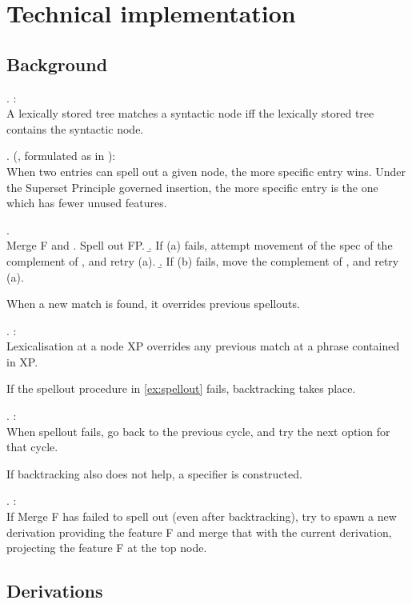 
\chapter{Technical implementation}


\section{Background}

\ex.  \citet{starke2009}:\\
A lexically stored tree matches a syntactic node iff the lexically stored tree contains the syntactic node.

\ex.  (\citealt{kiparsky1973}, formulated as in \citealt{caha2019}):\\
When two entries can spell out a given node, the more specific entry wins. Under the Superset Principle governed insertion, the more specific entry is the one which has fewer unused features.

\ex. \\
Merge F and \label{ex:spellout}
 \a. Spell out FP.
 \b. If (a) fails, attempt movement of the spec of the complement of , and retry (a).
 \b. If (b) fails, move the complement of , and retry (a).

When a new match is found, it overrides previous spellouts.

\ex.  \citep{starke2018}:\\
Lexicalisation at a node XP overrides any previous match at a phrase contained in XP.

If the spellout procedure in \ref{ex:spellout} fails, backtracking takes place.

\ex.  \citep{starke2018}:\\
When spellout fails, go back to the previous cycle, and try the next option for that cycle.\label{ex:backtracking}

If backtracking also does not help, a specifier is constructed.

\ex.  \citep{starke2018}:\\
If Merge F has failed to spell out (even after backtracking), try to spawn a new derivation providing the feature F and merge that with the current derivation, projecting the feature F at the top node.\label{ex:specformation}

\phantom{hi}



\section{Derivations}
